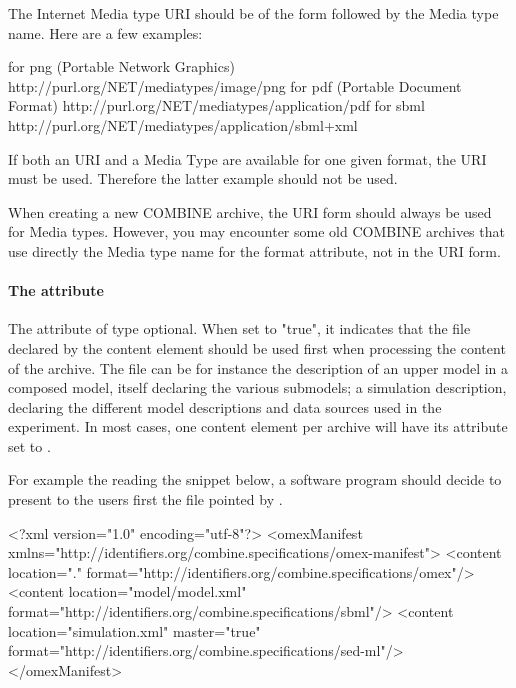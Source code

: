 The Internet Media type  URI should be of the form 
followed by the Media type name. Here are a few examples:

\begin{example}
    for png (Portable Network Graphics) http://purl.org/NET/mediatypes/image/png
    for pdf (Portable Document Format) http://purl.org/NET/mediatypes/application/pdf
    for sbml http://purl.org/NET/mediatypes/application/sbml+xml
\end{example}

If both an  URI and a Media Type are available for one given format, the
 URI must be used. Therefore the latter example should not be used. 

When creating a new COMBINE archive, the URI form should always be used for Media types. However, you may encounter some
old COMBINE archives that use directly the Media type name for the format attribute, not in the URI form.

\paragraph{The  attribute}
\label{active_document}
The  attribute of type  optional. When set to "true", it 
indicates that the file declared by the content element should be used first when 
processing the content of the archive. The file can be for instance the description of an upper model in a 
composed model, itself declaring the various submodels; a simulation description, 
declaring the different model descriptions and data sources used in the 
experiment. In most cases, one content element per archive will have its  
attribute set to .

For example the reading the snippet below, a software program should decide to present to the users first the file pointed by  .

\begin{example}
<?xml version="1.0" encoding="utf-8"?>
<omexManifest xmlns="http://identifiers.org/combine.specifications/omex-manifest">
    <content location="." format="http://identifiers.org/combine.specifications/omex"/>
    <content location="model/model.xml" 
        format="http://identifiers.org/combine.specifications/sbml"/>
    <content location="simulation.xml" master="true"
        format="http://identifiers.org/combine.specifications/sed-ml"/>
</omexManifest>
\end{example}

